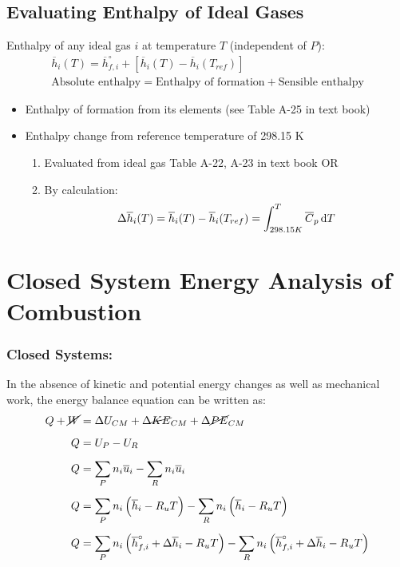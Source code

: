 \documentclass[class=report, crop=false, 12pt,a4paper]{standalone}
\numberwithin{equation}{section}
\begin{document}
\subsection{Evaluating Enthalpy of Ideal Gases}
Enthalpy of any ideal gas $i$ at temperature $T$ (independent of $P$):
\begin{gather}
  \overline{h}_{i}(T) = \overline{h}_{f,i}^\circ + \left[\overline{h}_{i}(T) - \overline{h}_{i}(T_{ref})\right] \\[5pt]
  \text{Absolute enthalpy}  = \text{Enthalpy of formation} + \text{Sensible enthalpy}
\end{gather}
\begin{itemize}[noitemsep]
  \item Enthalpy of formation from its elements (see Table A-25 in text book)
  \item Enthalpy change from reference temperature of 298.15 K
  \begin{enumerate}[noitemsep]
    \item Evaluated from ideal gas Table A-22, A-23 in text book OR
    \item By calculation:
    \begin{gather}
      \Delta \overline{h}_i(T) = \overline{h}_i(T) - \overline{h}_i(T_{ref}) = \int_{298.15K}^{T}\overline{C}_{p}\dif T
    \end{gather}
  \end{enumerate}
\end{itemize}
\section{Closed System Energy Analysis of Combustion}
\subsubsection{Closed Systems:}
In the absence of kinetic and potential energy changes as well as mechanical work, the energy balance equation can be written as:
\begin{align}
  Q + \cancel{W} &= \Delta U_{CM} + \Delta\cancel{KE}_{CM} + \Delta\cancel{PE}_{CM} \\[5pt]
  Q &= U_P - U_R \\[5pt]
  Q &= \sum_{P}n_i\overline{u}_i - \sum_{R}n_i\overline{u}_i \\[5pt]
  Q &= \sum_{P}n_i\left(\overline{h}_i - R_uT\right) - \sum_{R}n_i\left(\overline{h}_i - R_uT\right) \\[5pt]
  Q &= \sum_{P}n_i\left(\overline{h}_{f,i}^\circ + \Delta\overline{h}_{i} - R_uT\right) - \sum_{R}n_i\left(\overline{h}_{f,i}^\circ + \Delta\overline{h}_{i} - R_uT\right)
\end{align}
\end{document}
